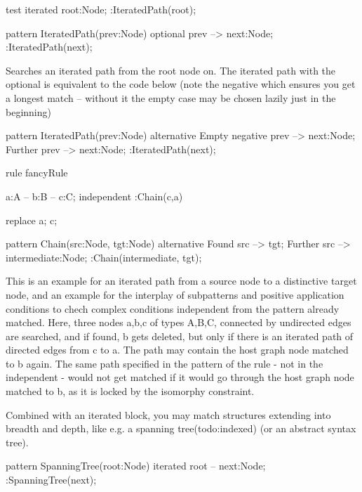 \begin{example}
  \begin{grgen}
test iterated {
  root:Node;
  :IteratedPath(root);
}

pattern IteratedPath(prev:Node) {
  optional {
    prev --> next:Node;
    :IteratedPath(next);
  }
}
  \end{grgen}
  
Searches an iterated path from the root node on. 
The iterated path with the optional is equivalent to the code below (note the negative which ensures you get a longest match -- without it the empty case may be chosen lazily just in the beginning)
  
  \begin{grgen}
pattern IteratedPath(prev:Node) {
  alternative {
    Empty {
      negative {
        prev --> next:Node;
      }
    }
    Further {
      prev --> next:Node;
      :IteratedPath(next);
    }
  }
}
  \end{grgen}
\end{example}


\begin{example}
  \begin{grgen}
rule fancyRule
{
  a:A -- b:B -- c:C;
  independent {
    :Chain(c,a)
  }
  
  replace {
    a; c;
  }
}

pattern Chain(src:Node, tgt:Node)
{
  alternative {
    Found {
      src --> tgt;
    }
    Further {
      src --> intermediate:Node;
      :Chain(intermediate, tgt);
    }
  }
}
  \end{grgen}

This is an example for an iterated path from a source node to a distinctive target node, and an example for the interplay of subpatterns and positive application conditions to chech complex conditions independent from the pattern already matched. Here, three nodes a,b,c of types A,B,C, connected by undirected edges are searched, and if found, b gets deleted, but only if there is an iterated path of directed edges from c to a. The path may contain the host graph node matched to b again. The same path specified in the pattern of the rule - not in the independent - would not get matched if it would go through the host graph node matched to b, as it is locked by the isomorphy constraint.

\end{example}

\begin{example}
Combined with an iterated block, you may match structures extending into breadth and depth,
like e.g. a spanning tree(todo:indexed) (or an abstract syntax tree).
  \begin{grgen}
pattern SpanningTree(root:Node)
{
  iterated {
    root -- next:Node;
    :SpanningTree(next);
  }
}
  \end{grgen}
\end{example}


